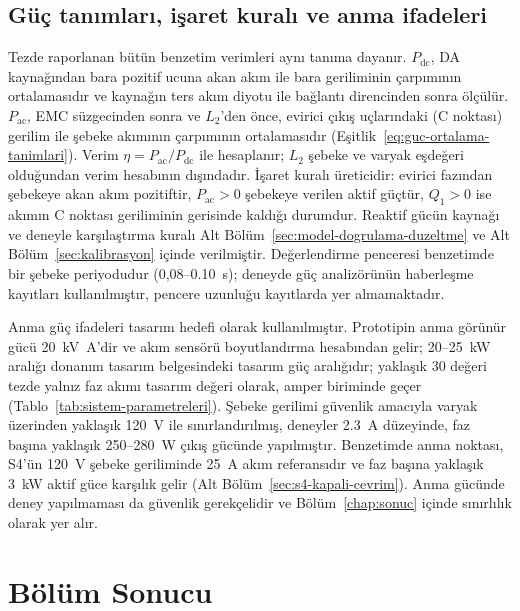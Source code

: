 \subsection{Güç tanımları, işaret kuralı ve anma ifadeleri}
\label{sec:guc-tanimlari}

Tezde raporlanan bütün benzetim verimleri aynı tanıma dayanır. $P_{\mathrm{dc}}$, DA kaynağından bara pozitif ucuna akan akım ile bara geriliminin çarpımının ortalamasıdır ve kaynağın ters akım diyotu ile bağlantı direncinden sonra ölçülür. $P_{\mathrm{ac}}$, EMC süzgecinden sonra ve $L_2$'den önce, evirici çıkış uçlarındaki (C noktası) gerilim ile şebeke akımının çarpımının ortalamasıdır (Eşitlik~\eqref{eq:guc-ortalama-tanimlari}). Verim $\eta=P_{\mathrm{ac}}/P_{\mathrm{dc}}$ ile hesaplanır; $L_2$ şebeke ve varyak eşdeğeri olduğundan verim hesabının dışındadır. İşaret kuralı üreticidir: evirici fazından şebekeye akan akım pozitiftir, $P_{\mathrm{ac}}>0$ şebekeye verilen aktif güçtür, $Q_1>0$ ise akımın C noktası geriliminin gerisinde kaldığı durumdur. Reaktif gücün kaynağı ve deneyle karşılaştırma kuralı Alt Bölüm~\ref{sec:model-dogrulama-duzeltme} ve Alt Bölüm~\ref{sec:kalibrasyon} içinde verilmiştir. Değerlendirme penceresi benzetimde bir şebeke periyodudur (0,08--\SI{0.10}{\second}); deneyde güç analizörünün haberleşme kayıtları kullanılmıştır, pencere uzunluğu kayıtlarda yer almamaktadır.

Anma güç ifadeleri tasarım hedefi olarak kullanılmıştır. Prototipin anma görünür gücü \SI{20}{\kilo\volt\ampere}'dir ve akım sensörü boyutlandırma hesabından gelir; \num{20}--\SI{25}{\kilo\watt} aralığı donanım tasarım belgesindeki tasarım güç aralığıdır; yaklaşık 30 değeri tezde yalnız faz akımı tasarım değeri olarak, amper biriminde geçer (Tablo~\ref{tab:sistem-parametreleri}). Şebeke gerilimi güvenlik amacıyla varyak üzerinden yaklaşık \SI{120}{\volt} ile sınırlandırılmış, deneyler \SI{2.3}{\ampere} düzeyinde, faz başına yaklaşık \num{250}--\SI{280}{\watt} çıkış gücünde yapılmıştır. Benzetimde anma noktası, S4'ün \SI{120}{\volt} şebeke geriliminde \SI{25}{\ampere} akım referansıdır ve faz başına yaklaşık \SI{3}{\kilo\watt} aktif güce karşılık gelir (Alt Bölüm~\ref{sec:s4-kapali-cevrim}). Anma gücünde deney yapılmaması da güvenlik gerekçelidir ve Bölüm~\ref{chap:sonuc} içinde sınırlılık olarak yer alır.

\section{Bölüm Sonucu}

